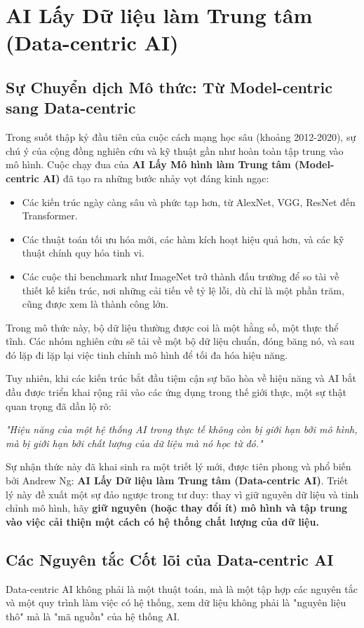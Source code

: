 \section{AI Lấy Dữ liệu làm Trung tâm (Data-centric AI)}
\label{sec:data_centric_ai}

\subsection{Sự Chuyển dịch Mô thức: Từ Model-centric sang Data-centric}
\label{subsec:paradigm_shift_model_to_data}
Trong suốt thập kỷ đầu tiên của cuộc cách mạng học sâu (khoảng 2012-2020), sự chú ý của cộng đồng nghiên cứu và kỹ thuật gần như hoàn toàn tập trung vào mô hình. Cuộc chạy đua của \textbf{AI Lấy Mô hình làm Trung tâm (Model-centric AI)} đã tạo ra những bước nhảy vọt đáng kinh ngạc:
\begin{itemize}
	\item Các kiến trúc ngày càng sâu và phức tạp hơn, từ AlexNet, VGG, ResNet đến Transformer.
	\item Các thuật toán tối ưu hóa mới, các hàm kích hoạt hiệu quả hơn, và các kỹ thuật chính quy hóa tinh vi.
	\item Các cuộc thi benchmark như ImageNet trở thành đấu trường để so tài về thiết kế kiến trúc, nơi những cải tiến về tỷ lệ lỗi, dù chỉ là một phần trăm, cũng được xem là thành công lớn.
\end{itemize}
Trong mô thức này, bộ dữ liệu thường được coi là một hằng số, một thực thể tĩnh. Các nhóm nghiên cứu sẽ tải về một bộ dữ liệu chuẩn, đóng băng nó, và sau đó lặp đi lặp lại việc tinh chỉnh mô hình để tối đa hóa hiệu năng.

Tuy nhiên, khi các kiến trúc bắt đầu tiệm cận sự bão hòa về hiệu năng và AI bắt đầu được triển khai rộng rãi vào các ứng dụng trong thế giới thực, một sự thật quan trọng đã dần lộ rõ:
\begin{center}
	\textit{"Hiệu năng của một hệ thống AI trong thực tế không còn bị giới hạn bởi mô hình, mà bị giới hạn bởi chất lượng của dữ liệu mà nó học từ đó."}
\end{center}
Sự nhận thức này đã khai sinh ra một triết lý mới, được tiên phong và phổ biến bởi Andrew Ng: \textbf{AI Lấy Dữ liệu làm Trung tâm (Data-centric AI)}. Triết lý này đề xuất một sự đảo ngược trong tư duy: thay vì giữ nguyên dữ liệu và tinh chỉnh mô hình, hãy \textbf{giữ nguyên (hoặc thay đổi ít) mô hình và tập trung vào việc cải thiện một cách có hệ thống chất lượng của dữ liệu.}

\subsection{Các Nguyên tắc Cốt lõi của Data-centric AI}
\label{subsec:data_centric_principles}
Data-centric AI không phải là một thuật toán, mà là một tập hợp các nguyên tắc và một quy trình làm việc có hệ thống, xem dữ liệu không phải là "nguyên liệu thô" mà là "mã nguồn" của hệ thống AI.

